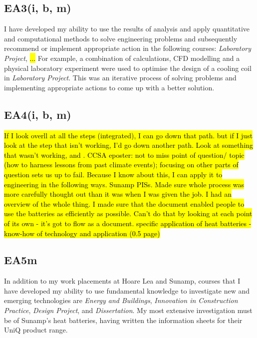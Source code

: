 \subsection*{EA3(i, b, m)} \label{EA3}

I have developed my ability to use the results of analysis and apply quantitative and computational methods to solve engineering problems and subsequently recommend or implement appropriate action in the following courses:
\textit{Laboratory Project},
\hl{...}
For example, a combination of calculations, CFD modelling and a physical laboratory experiment were used to optimise the design of a cooling coil in \textit{Laboratory Project}.
This was an iterative process of solving problems and implementing appropriate actions to come up with a better solution.





\subsection*{EA4(i, b, m)}

\hl{If I look overll at all the steps (integrated), I can go down that path. but if I just look at the step that isn't working, I'd go down another path. Look at something that wasn't working, and . CCSA eposter: not to miss point of question/ topic (how to harness lessons from past climate events); focusing on other parts of question sets us up to fail. Because I know about this, I can apply it to engineering in the following ways. Sunamp PISs. Made sure whole process was more carefully thought out than it was when I was given the job. I had an overview of the whole thing. I made sure that the document enabled people to use the batteries as efficiently as possible. Can't do that by looking at each point of its own - it's got to flow as a document. specific application of heat batteries  - know-how  of technology and application (0.5 page)}



\subsection*{EA5m}

In addition to my work placements at Hoare Lea and Sunamp, courses that I have developed my ability to use fundamental knowledge to investigate new and emerging technologies are
\textit{Energy and Buildings},
\textit{Innovation in Construction Practice},
\textit{Design Project},
and \textit{Dissertation}.
My most extensive investigation must be of Sunamp's heat batteries, having written the information sheets for their UniQ product range.





